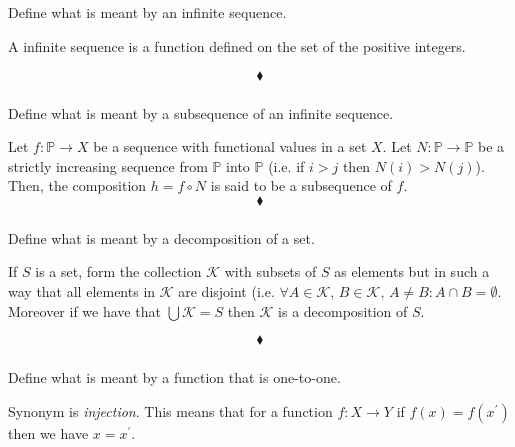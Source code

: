 \subsection{}
\subsubsection{}
\begin{tcolorbox}
Define what is meant by an infinite sequence.
\end{tcolorbox}
A infinite sequence is a function defined on the set of the positive integers.

$$\blacklozenge$$

\subsubsection{}
\begin{tcolorbox}
Define what is meant by a subsequence of an infinite sequence.
\end{tcolorbox}
Let $f:\mathbb{P}\rightarrow X$ be a sequence with functional values in a set $X$. Let $N:\mathbb{P}\rightarrow\mathbb{P}$ be a strictly increasing sequence from $\mathbb{P}$ into $\mathbb{P}$ (i.e. if $i>j$ then $N(i)> N(j)$). Then, the composition $h=f\circ N$ is said to be a subsequence of $f$.
$$\blacklozenge$$

\subsubsection{}
\begin{tcolorbox}
Define what is meant by a decomposition of a set.
\end{tcolorbox}
If $S$ is a set, form the collection $\mathscr{K}$ with subsets of $S$ as elements but in such a way that all elements in $\mathscr{K}$ are disjoint (i.e. $\forall A\in \mathscr{K},\, B \in \mathscr{K},\, A\neq B: A\cap B=\emptyset$. Moreover if we have that $\bigcup \mathscr{K}= S$ then  $\mathscr{K}$ is a decomposition of $S$. 

$$\blacklozenge$$

\subsubsection{}
\begin{tcolorbox}
Define what is meant by a function that is one-to-one.
\end{tcolorbox}
Synonym is \textit{injection}. This means that for a function $f:X\rightarrow Y$ if $f(x)=f(x^{'})$ then we have $x=x^{'}$.

